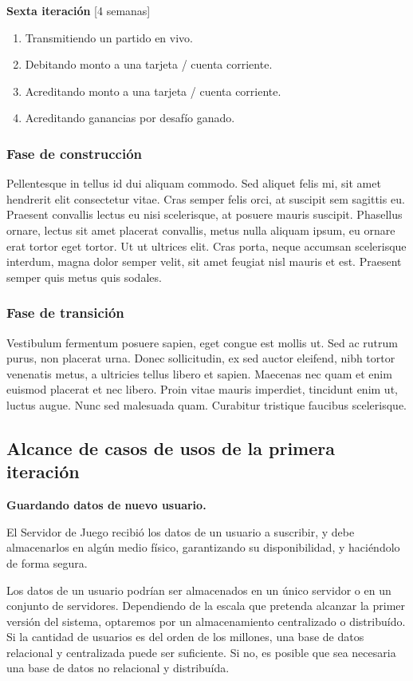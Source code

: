 \documentclass[a4paper, 10pt, twoside]{article}
\begin{document}
\textbf{Sexta iteración} [4 semanas]
\begin{enumerate}
\item Transmitiendo un partido en vivo.
\item Debitando monto a una tarjeta / cuenta corriente.
\item Acreditando monto a una tarjeta / cuenta corriente.
\item Acreditando ganancias por desafío ganado.
\end{enumerate}

\subsubsection{Fase de construcción}
Pellentesque in tellus id dui aliquam commodo. Sed aliquet felis mi, sit amet hendrerit elit consectetur vitae. Cras semper felis orci, at suscipit sem sagittis eu. Praesent convallis lectus eu nisi scelerisque, at posuere mauris suscipit. Phasellus ornare, lectus sit amet placerat convallis, metus nulla aliquam ipsum, eu ornare erat tortor eget tortor. Ut ut ultrices elit. Cras porta, neque accumsan scelerisque interdum, magna dolor semper velit, sit amet feugiat nisl mauris et est. Praesent semper quis metus quis sodales.

\subsubsection{Fase de transición}
Vestibulum fermentum posuere sapien, eget congue est mollis ut. Sed ac rutrum purus, non placerat urna. Donec sollicitudin, ex sed auctor eleifend, nibh tortor venenatis metus, a ultricies tellus libero et sapien. Maecenas nec quam et enim euismod placerat et nec libero. Proin vitae mauris imperdiet, tincidunt enim ut, luctus augue. Nunc sed malesuada quam. Curabitur tristique faucibus scelerisque.

\subsection{Alcance de casos de usos de la primera iteración}
\textbf{Guardando datos de nuevo usuario.}

El Servidor de Juego recibió los datos de un usuario a suscribir, y debe almacenarlos en algún medio físico, garantizando su disponibilidad, y haciéndolo de forma segura.

Los datos de un usuario podrían ser almacenados en un único servidor o en un conjunto de servidores. Dependiendo de la escala que pretenda alcanzar la primer versión del sistema, optaremos por un almacenamiento centralizado o distribuído. Si la cantidad de usuarios es del orden de los millones, una base de datos relacional y centralizada puede ser suficiente. Si no, es posible que sea necesaria una base de datos no relacional y distribuída.
\end{document}
